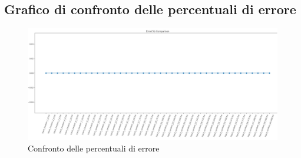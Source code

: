 \subsection{Grafico di confronto delle percentuali di errore}
\begin{center}
	\begin{figure}[H]
		\centering
		\hspace{-1cm}\includegraphics[width=\linewidth]{Img/err_perc_graph.jpg}
		\caption{Confronto delle percentuali di errore}
	\end{figure}
\end{center}

\pagebreak